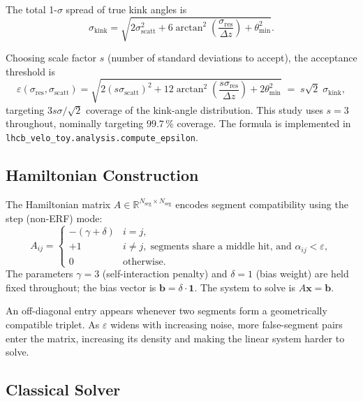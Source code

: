 \documentclass[11pt,a4paper]{article}
\newcommand{\eps}{\varepsilon}
\newcommand{\sres}{\sigma_{\mathrm{res}}}
\newcommand{\sscat}{\sigma_{\mathrm{scatt}}}
\newcommand{\srkink}{\sigma_{\mathrm{kink}}}
\newcommand{\thmin}{\theta_{\min}}
\newcommand{\Dz}{\Delta z}
\newcommand{\Nseg}{N_{\mathrm{seg}}}
\newcommand{\codepath}[1]{\texttt{#1}}
\begin{document}
The total 1-$\sigma$ spread of true kink angles is
\begin{equation}
  \srkink = \sqrt{2\sscat^2 + 6\arctan^2\!\!\!\left(\frac{\sres}{\Dz}\right)
            + \theta_{\min}^2}.
\end{equation}

Choosing scale factor $s$ (number of standard deviations to accept), the
acceptance threshold is
\begin{equation}
  \boxed{
    \eps\!\left(\sres,\sscat\right) =
    \sqrt{2\!\left(s\sscat\right)^2
         + 12\arctan^2\!\!\!\left(\frac{s\sres}{\Dz}\right)
         + 2\thmin^2}
    \;=\; s\sqrt{2}\;\srkink,
  }
  \label{eq:eps}
\end{equation}
targeting $3s\sigma/\sqrt{2}$ coverage of the kink-angle distribution.
This study uses $s=3$ throughout, nominally targeting $99.7\,\%$ coverage.
The formula is implemented in \codepath{lhcb\_velo\_toy.analysis.compute\_epsilon}.

\subsection{Hamiltonian Construction}
\label{sec:theory:ham}

The Hamiltonian matrix $A\in\mathbb{R}^{\Nseg\times\Nseg}$ encodes segment
compatibility using the step (non-ERF) mode:
\begin{equation}
  A_{ij} = \begin{cases}
    -(\gamma+\delta) & i=j, \\
    +1 & i\neq j,\;\text{segments share a middle hit, and }\alpha_{ij}<\eps, \\
    0  & \text{otherwise.}
  \end{cases}
\end{equation}
The parameters $\gamma=3$ (self-interaction penalty) and $\delta=1$ (bias weight) are
held fixed throughout; the bias vector is $\mathbf{b}=\delta\cdot\mathbf{1}$.  The
system to solve is $A\mathbf{x}=\mathbf{b}$.

An off-diagonal entry appears whenever two segments form a geometrically compatible
triplet.  As $\eps$ widens with increasing noise, more false-segment pairs enter the
matrix, increasing its density and making the linear system harder to solve.

\subsection{Classical Solver}
\label{sec:theory:classical}
\end{document}

